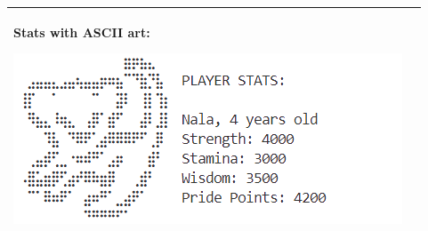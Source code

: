 \begin{longtable}{|p{2.0in}|p{4.0in}|}
\begin{example}
Stats with ASCII art:

\includegraphics[]{images/project2/PrintStats3.png}
\end{example}

\\ \hline
\end{longtable}

